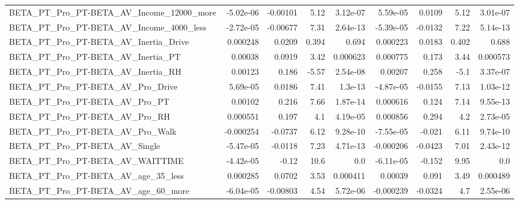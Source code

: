 \begin{tabular}{lrrrrrrrr}
BETA\_PT\_Pro\_PT-BETA\_AV\_Income\_12000\_more           &   -5.02e-06 &     -0.00101 &     5.12 & 3.12e-07 &   5.59e-05 &      0.0109 &         5.12 &      3.01e-07 \\
BETA\_PT\_Pro\_PT-BETA\_AV\_Income\_4000\_less            &   -2.72e-05 &     -0.00677 &     7.31 & 2.64e-13 &  -5.39e-05 &     -0.0132 &         7.22 &      5.14e-13 \\
BETA\_PT\_Pro\_PT-BETA\_AV\_Inertia\_Drive               &    0.000248 &       0.0209 &    0.394 &    0.694 &   0.000223 &      0.0183 &        0.402 &         0.688 \\
BETA\_PT\_Pro\_PT-BETA\_AV\_Inertia\_PT                  &     0.00038 &       0.0919 &     3.42 & 0.000623 &   0.000775 &       0.173 &         3.44 &      0.000573 \\
BETA\_PT\_Pro\_PT-BETA\_AV\_Inertia\_RH                  &     0.00123 &        0.186 &    -5.57 & 2.54e-08 &    0.00207 &       0.258 &         -5.1 &      3.37e-07 \\
BETA\_PT\_Pro\_PT-BETA\_AV\_Pro\_Drive                   &    5.69e-05 &       0.0186 &     7.41 &  1.3e-13 &  -4.87e-05 &     -0.0155 &         7.13 &      1.03e-12 \\
BETA\_PT\_Pro\_PT-BETA\_AV\_Pro\_PT                      &     0.00102 &        0.216 &     7.66 & 1.87e-14 &   0.000616 &       0.124 &         7.14 &      9.55e-13 \\
BETA\_PT\_Pro\_PT-BETA\_AV\_Pro\_RH                      &    0.000551 &        0.197 &      4.1 & 4.19e-05 &   0.000856 &       0.294 &          4.2 &      2.73e-05 \\
BETA\_PT\_Pro\_PT-BETA\_AV\_Pro\_Walk                    &   -0.000254 &      -0.0737 &     6.12 & 9.28e-10 &  -7.55e-05 &      -0.021 &         6.11 &      9.74e-10 \\
BETA\_PT\_Pro\_PT-BETA\_AV\_Single                      &   -5.47e-05 &      -0.0118 &     7.23 & 4.71e-13 &  -0.000206 &     -0.0423 &         7.01 &      2.43e-12 \\
BETA\_PT\_Pro\_PT-BETA\_AV\_WAITTIME                    &   -4.42e-05 &        -0.12 &     10.6 &      0.0 &  -6.11e-05 &      -0.152 &         9.95 &           0.0 \\
BETA\_PT\_Pro\_PT-BETA\_AV\_age\_35\_less                 &    0.000285 &       0.0702 &     3.53 & 0.000411 &    0.00039 &       0.091 &         3.49 &      0.000489 \\
BETA\_PT\_Pro\_PT-BETA\_AV\_age\_60\_more                 &   -6.04e-05 &     -0.00803 &     4.54 & 5.72e-06 &  -0.000239 &     -0.0324 &          4.7 &      2.55e-06 \\

\end{tabular}
